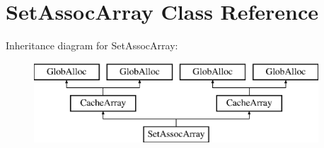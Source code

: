 \hypertarget{classSetAssocArray}{\section{Set\-Assoc\-Array Class Reference}
\label{classSetAssocArray}
}
Inheritance diagram for Set\-Assoc\-Array\-:\begin{figure}[H]
\begin{center}
\leavevmode
\includegraphics[height=3.000000cm]{classSetAssocArray}
\end{center}
\end{figure}
